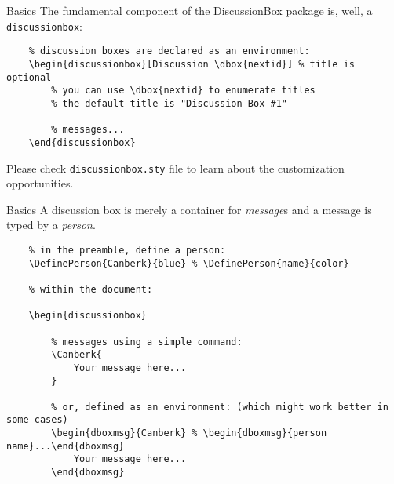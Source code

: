 \documentclass{article}
\begin{document}
\begin{discussionbox}

    \begin{dboxmsg}{Basics}
        The fundamental component of the DiscussionBox package is, well, a \texttt{discussionbox}:
        \begin{verbatim}
    % discussion boxes are declared as an environment:
    \begin{discussionbox}[Discussion \dbox{nextid}] % title is optional
        % you can use \dbox{nextid} to enumerate titles
        % the default title is "Discussion Box #1"

        % messages...
    \end{discussionbox}
        \end{verbatim}

        Please check \texttt{discussionbox.sty} file to learn about the customization opportunities.
    \end{dboxmsg}

    \begin{dboxmsg}{Basics}
        A discussion box is merely a container for \textit{message}s and a message is typed by a \textit{person}.

        \begin{verbatim}
    % in the preamble, define a person:
    \DefinePerson{Canberk}{blue} % \DefinePerson{name}{color}
    
    % within the document:

    \begin{discussionbox}

        % messages using a simple command:
        \Canberk{
            Your message here...
        }

        % or, defined as an environment: (which might work better in some cases)
        \begin{dboxmsg}{Canberk} % \begin{dboxmsg}{person name}...\end{dboxmsg}
            Your message here...
        \end{dboxmsg}


\end{verbatim}
\end{dboxmsg}
\end{discussionbox}
\end{document}
